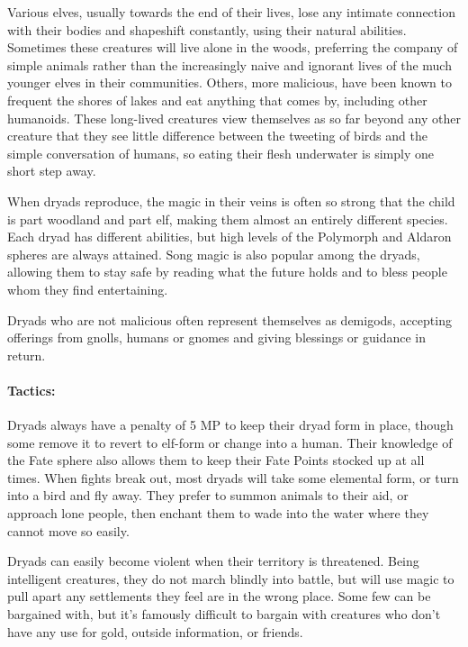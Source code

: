 \begin{multicols}{2}

\label{dryad}

Various elves, usually towards the end of their lives, lose any intimate connection with their bodies and shapeshift constantly, using their natural abilities.  Sometimes these creatures will live alone in the woods, preferring the company of simple animals rather than the increasingly naive and ignorant lives of the much younger elves in their communities.  Others, more malicious, have been known to frequent the shores of lakes and eat anything that comes by, including other humanoids.  These long-lived creatures view themselves as so far beyond any other creature that they see little difference between the tweeting of birds and the simple conversation of humans, so eating their flesh underwater is simply one short step away.

When dryads reproduce, the magic in their veins is often so strong that the child is part woodland and part elf, making them almost an entirely different species.
Each dryad has different abilities, but high levels of the Polymorph and Aldaron spheres are always attained.
Song magic is also popular among the dryads, allowing them to stay safe by reading what the future holds and to bless people whom they find entertaining.

Dryads who are not malicious often represent themselves as demigods, accepting offerings from gnolls, humans or gnomes and giving blessings or guidance in return.

\dryad

\paragraph{Tactics:}
Dryads always have a penalty of 5 MP to keep their dryad form in place, though some remove it to revert to elf-form or change into a human.
Their knowledge of the Fate sphere also allows them to keep their Fate Points stocked up at all times.
When fights break out, most dryads will take some elemental form, or turn into a bird and fly away.
They prefer to summon animals to their aid, or approach lone people, then enchant them to wade into the water where they cannot move so easily.

Dryads can easily become violent when their territory is threatened.
Being intelligent creatures, they do not march blindly into battle, but will use magic to pull apart any settlements they feel are in the wrong place.
Some few can be bargained with, but it's famously difficult to bargain with creatures who don't have any use for gold, outside information, or friends.


\end{multicols}
